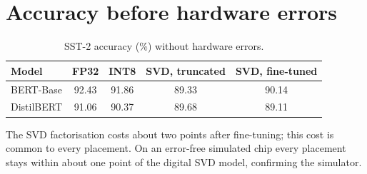 \documentclass[10pt,a4paper]{article}
\begin{document}
\section{Accuracy before hardware errors}
\begin{table}[H]
\centering\small
\caption{SST-2 accuracy (\%) without hardware errors.}
\begin{tabular}{@{}lcccc@{}}
\toprule
Model & FP32 & INT8 & SVD, truncated & SVD, fine-tuned \\
\midrule
BERT-Base & 92.43 & 91.86 & 89.33 & 90.14 \\
DistilBERT & 91.06 & 90.37 & 89.68 & 89.11 \\
\bottomrule
\end{tabular}
\end{table}
\noindent The SVD factorisation costs about two points after fine-tuning; this cost is common to every
placement. On an error-free simulated chip every placement stays within about one point of the digital
SVD model, confirming the simulator.
\end{document}
